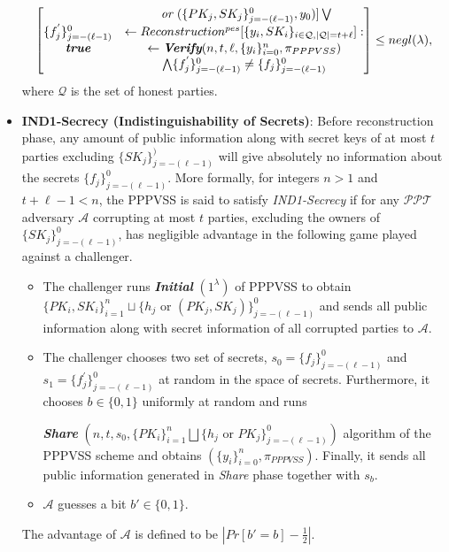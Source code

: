\begin{itemize}
\begin{align*}
\begin{bmatrix}
        &\textit{ or }(\{PK_j,SK_j\}_{j=-(\ell-1)}^0,y_0)]\bigvee\\
        \{f_j^{'}\}_{j=-(\ell-1)}^0&\leftarrow Reconstruction^{pes}[\{y_i,SK_i\}_{i\in\mathcal{Q},|\mathcal{Q}|=t+\ell}]:\\
        \textit{\textbf{true}}&\leftarrow \textit{\textbf{Verify}} (n,t,\ell,\{y_i\}_{i=0}^n,\pi_{PPPVSS})\\
        &\bigwedge \{f_j^{'}\}_{j=-(\ell-1)}^0\neq \{f_j\}_{j=-(\ell-1)}^0
      \end{bmatrix} \leq negl(\lambda),
    \end{align*}
    where $\mathcal{Q}$ is the set of honest parties.
  \item \textbf{IND1-Secrecy (Indistinguishability of Secrets)}: Before reconstruction phase, any amount of public 
    information along with secret keys of at most $t$ parties excluding $\{SK_j\}_{j=-(\ell-1)}^)$ will give 
    absolutely no information about the secrets $\{f_j\}_{j=-(\ell-1)}^0$. More formally, for integers $n>1$ and 
    $t+\ell-1<n$, the PPPVSS is said to satisfy \textit{IND1-Secrecy} if for any $\mathcal{PPT}$ adversary $\mathcal{A}$ 
    corrupting at most $t$ parties, excluding the owners of $\{SK_j\}_{j=-(\ell-1)}^0$, has negligible 
    advantage in the following game \cite{cryptoeprint:2025/576} played against a challenger.
    \begin{itemize}
      \item The challenger runs \textit{\textbf{Initial}} $(1^\lambda)$ of PPPVSS to obtain 
        $\{PK_i,SK_i\}_{i=1}^n\sqcup\{h_j\text{ or }(PK_j,SK_j)\}_{j=-(\ell-1)}^0$ and sends all public 
        information along with secret information of all corrupted parties to $\mathcal{A}$.
      \item The challenger chooses two set of secrets, $s_0=\{f_j\}_{j=-(\ell-1)}^0$ and 
        $s_1=\{f_j^{'}\}_{j=-(\ell-1)}^0$ at random in the space of secrets. Furthermore, it chooses $b\in\{0,1\}$ 
        uniformly at random and runs \par 
        \textit{\textbf{Share}} $(n,t,s_0,\{PK_i\}_{i=1}^n\bigsqcup\{h_j\text{ or }PK_j\}_{j=-(\ell-1)}^0)$ 
        algorithm of the PPPVSS scheme and obtains $(\{y_i\}_{i=0}^n,\pi_{PPPVSS})$. Finally, it sends 
        all public information generated in \textit{Share} phase together with $s_b$.
      \item $\mathcal{A}$ guesses a bit $b'\in\{0,1\}$.
    \end{itemize}
    The advantage of $\mathcal{A}$ is defined to be $|Pr[b'=b]-\frac{1}{2}|$.
\end{itemize}

